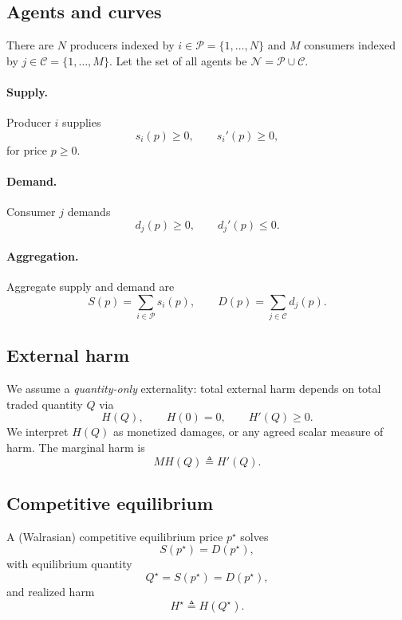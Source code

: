 \documentclass[journal, a4paper]{IEEEtran}
\begin{document}
\subsection{Agents and curves}
There are $N$ producers indexed by $i\in \mathcal{P}=\{1,\dots,N\}$ and $M$ consumers indexed by $j\in \mathcal{C}=\{1,\dots,M\}$. Let the set of all agents be $\mathcal{N}=\mathcal{P}\cup \mathcal{C}$.

\paragraph{Supply.}
Producer $i$ supplies
\begin{equation}
s_i(p)\ge 0,\qquad s_i'(p)\ge 0,
\end{equation}
for price $p\ge 0$.

\paragraph{Demand.}
Consumer $j$ demands
\begin{equation}
d_j(p)\ge 0,\qquad d_j'(p)\le 0.
\end{equation}

\paragraph{Aggregation.}
Aggregate supply and demand are
\begin{equation}
S(p)=\sum_{i\in \mathcal{P}} s_i(p),\qquad D(p)=\sum_{j\in \mathcal{C}} d_j(p).
\end{equation}

\subsection{External harm}
We assume a \emph{quantity-only} externality: total external harm depends on total traded quantity $Q$ via
\begin{equation}
H(Q),\qquad H(0)=0,\qquad H'(Q)\ge 0.
\end{equation}
We interpret $H(Q)$ as monetized damages, or any agreed scalar measure of harm. The marginal harm is
\begin{equation}
MH(Q) \triangleq H'(Q).
\end{equation}

\subsection{Competitive equilibrium}
A (Walrasian) competitive equilibrium price $p^\star$ solves
\begin{equation}
S(p^\star)=D(p^\star),
\end{equation}
with equilibrium quantity
\begin{equation}
Q^\star = S(p^\star)=D(p^\star),
\end{equation}
and realized harm
\begin{equation}
H^\star \triangleq H(Q^\star).
\end{equation}
\end{document}
